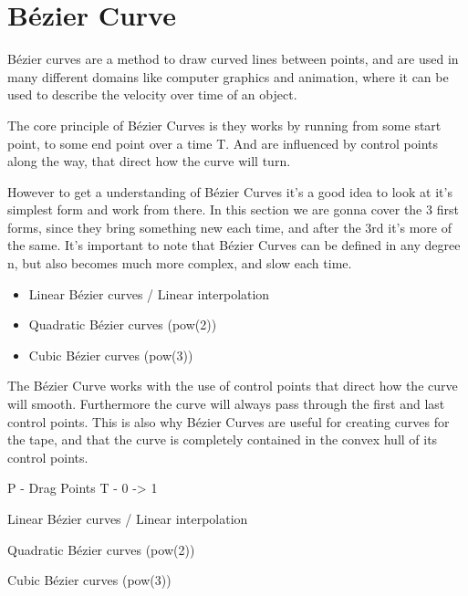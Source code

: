\section{Bézier Curve}
Bézier curves are a method to draw curved lines between points, and are used in many different domains like computer graphics and animation, where it can be used to describe the velocity over time of an object. 

The core principle of Bézier Curves is they works by running from some start point, to some end point over a time T. And are influenced by control points along the way, that direct how the curve will turn. 

However to get a understanding of Bézier Curves it's a good idea to look at it's simplest form and work from there. In this section we are gonna cover the 3 first forms, since they bring something new each time, and after the 3rd it's more of the same. It's important to note that Bézier Curves can be defined in any degree n, but also becomes much more complex, and slow each time. 

\begin{itemize}
  \item Linear Bézier curves / Linear interpolation
  \item Quadratic Bézier curves (pow(2))
  \item Cubic Bézier curves (pow(3))
\end{itemize}




The Bézier Curve works with the use of control points that direct how the curve will smooth. Furthermore the curve will always pass through the first and last control points. This is also why Bézier Curves are useful for creating curves for the tape, and that the curve is completely contained in the convex hull of its control points.  





P - Drag Points
T - 0 -> 1






Linear Bézier curves / Linear interpolation


Quadratic Bézier curves (pow(2))



Cubic Bézier curves (pow(3))





